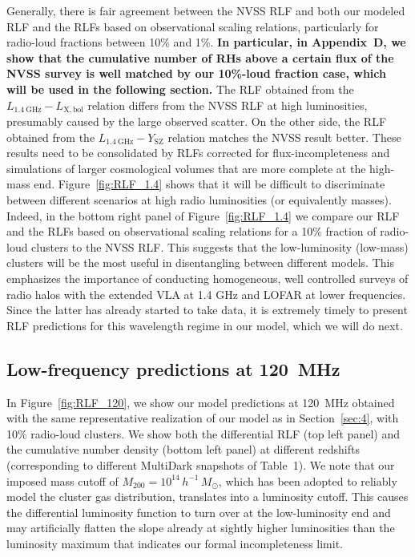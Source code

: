 \documentclass[traditabstract]{aa}
\def\C#1{{\bf #1}}
\newcommand{\rmn}{\mathrm}
\begin{document}
Generally, there is fair agreement between the NVSS RLF and both our modeled RLF
and the RLFs based on observational scaling relations, particularly for radio-loud 
fractions between 10\% and 1\%. \C{In particular, in Appendix~D, we show that the 
cumulative number of RHs above a certain flux of the NVSS survey is well matched 
by our 10\%-loud fraction case, which will be used in the following section.} 
The RLF obtained from the $L_{1.4~\rmn{GHz}}-L_{\rmn{X,bol}}$ relation differs from the 
NVSS RLF at high luminosities, presumably caused by the large observed scatter. 
On the other side, the RLF obtained from the $L_{1.4~\rmn{GHz}}-Y_{\rmn{SZ}}$ relation
matches the NVSS result better. These results need to be consolidated by RLFs
corrected for flux-incompleteness and simulations of larger cosmological volumes
that are more complete at the high-mass end. Figure~\ref{fig:RLF_1.4} shows that
it will be difficult to discriminate between different scenarios at high radio
luminosities (or equivalently masses). Indeed, in the bottom right panel of
Figure~\ref{fig:RLF_1.4} we compare our RLF and the RLFs based on observational
scaling relations for a 10\% fraction of radio-loud clusters to the NVSS
RLF. This suggests that the low-luminosity (low-mass) clusters will be the most
useful in disentangling between different models. This emphasizes the importance
of conducting homogeneous, well controlled surveys of radio halos with the
extended VLA at 1.4 GHz and LOFAR at lower frequencies. Since the latter has
already started to take data, it is extremely timely to present RLF predictions
for this wavelength regime in our model, which we will do next.


\subsection{Low-frequency predictions at 120~MHz}

In Figure~\ref{fig:RLF_120}, we show our model predictions at 120~MHz obtained
with the same representative realization of our model as in Section~\ref{sec:4},
with 10\% radio-loud clusters. We show both the differential RLF (top left
panel) and the cumulative number density (bottom left panel) at different
redshifts (corresponding to different MultiDark snapshots of Table~1). We note
that our imposed mass cutoff of $M_{200}=10^{14}\,h^{-1}\,M_\odot$, which has
been adopted to reliably model the cluster gas distribution, translates into a
luminosity cutoff. This causes the differential luminosity function to turn over
at the low-luminosity end and may artificially flatten the slope already at
sightly higher luminosities than the luminosity maximum that indicates our formal
incompleteness limit. 
\end{document}
